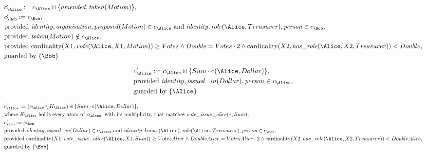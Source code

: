 \begin{align*}
&
c'_
{
\Alice
}
 := 
c_
{
\Alice
}
 \uplus 
\{
\mathit{\detokenize{
amended
}}
,
\mathit{\detokenize{
taken
}}
(
Motion
)
\}
,\\
&
c'_
{
\Bob
}
 := 
c_
{
\Bob
}
,\\
&
\text{provided } 
\mathit{\detokenize{
identity
}}
,
\mathit{\detokenize{
organisation
}}
,
\mathit{\detokenize{
proposed
}}
(
Motion
)
 \in c_
{
\Alice
}
 \text{ and } 
\mathit{\detokenize{
identity
}}
,
\mathit{\detokenize{
role
}}
(
\Alice
,
Treasurer
)
,
\mathit{\detokenize{
person
}}
 \in c_
{
\Bob
}
,\\
&
\text{provided } 
\mathit{\detokenize{
taken
}}
(
Motion
)
 \notin c_
{
\Alice
}
,\\
&
\text{provided } 
\mathrm{cardinality}(
X1
,
\mathit{\detokenize{
vote
}}
(
\Alice
,
X1
,
Motion
)
)
\ge
Votes
\land
Double
=
Votes
\cdot
2
\land
\mathrm{cardinality}(
X2
,
\mathit{\detokenize{
has_role
}}
(
\Alice
,
X2
,
Treasurer
)
)
<
Double
,\\
&
\text{guarded by } \{
\Bob
\}
\end{align*}

\begin{align*}
&
c'_
{
\Alice
}
 := 
c_
{
\Alice
}
 \uplus 
\{
Sum
\cdot
\text{\textcent}
(
\Alice
,
Dollar
)
\}
,\\
&
\text{provided } 
\mathit{\detokenize{
identity
}}
,
\mathit{\detokenize{
issued_in
}}
(
Dollar
)
,
\mathit{\detokenize{
person
}}
 \in c_
{
\Alice
}
,\\
&
\text{guarded by } \{
\Alice
\}
\end{align*}

\begin{align*}
&
c'_
{
\Alice
}
 := 
(
c_
{
\Alice
}
 \setminus K_
{
\Alice
}
) \uplus 
\{
Sum
\cdot
\text{\textcent}
(
\Alice
,
Dollar
)
\}
,\\
&
\text{where } K_
{
\Alice
}
 \text{ holds every atom of } c_
{
\Alice
}
 \text{, with its multiplicity, that matches } 
\mathit{\detokenize{
vote_issue_alice
}}
(
\ast
,
Sum
)
,\\
&
c'_
{
\Bob
}
 := 
c_
{
\Bob
}
,\\
&
\text{provided } 
\mathit{\detokenize{
identity
}}
,
\mathit{\detokenize{
issued_in
}}
(
Dollar
)
 \in c_
{
\Alice
}
 \text{ and } 
\mathit{\detokenize{
identity
}}
,
\mathit{\detokenize{
knows
}}
(
\Alice
)
,
\mathit{\detokenize{
role
}}
(
\Alice
,
Treasurer
)
,
\mathit{\detokenize{
person
}}
 \in c_
{
\Bob
}
,\\
&
\text{provided } 
\mathrm{cardinality}(
X1
,
\mathit{\detokenize{
vote_issue_alice
}}
(
\Alice
,
X1
,
Sum
)
)
\ge
VotesAlice
\land
DoubleAlice
=
VotesAlice
\cdot
2
\land
\mathrm{cardinality}(
X2
,
\mathit{\detokenize{
has_role
}}
(
\Alice
,
X2
,
Treasurer
)
)
<
DoubleAlice
,\\
&
\text{guarded by } \{
\Bob
\}
\end{align*}
